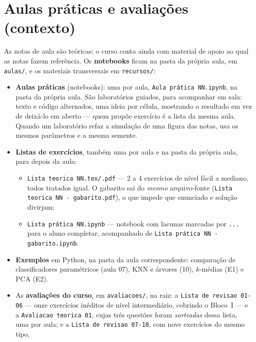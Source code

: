\documentclass[11pt,a4paper]{article}
\begin{document}
\section{Aulas práticas e avaliações (contexto)}
As notas de aula são teóricas; o curso conta ainda com material de apoio ao qual
as notas fazem referência. Os \textbf{notebooks} ficam na pasta da própria aula,
em \texttt{aulas/}, e os materiais transversais em \texttt{recursos/}:
\begin{itemize}[leftmargin=1.4cm]
  \item \textbf{Aulas práticas} (notebooks): uma por aula,
        \texttt{Aula prática NN.ipynb}, na pasta da própria aula. São
        laboratórios guiados, para acompanhar em sala: texto e código
        alternados, uma ideia por célula, mostrando o resultado em vez de
        deixá-lo em aberto --- quem propõe exercício é a lista da mesma aula.
        Quando um laboratório refaz a simulação de uma figura das notas, usa os
        mesmos parâmetros e a mesma semente.
  \item \textbf{Listas de exercícios}, também uma por aula e na pasta da própria
        aula, para depois da aula:
        \begin{itemize}
          \item \texttt{Lista teorica NN.tex/.pdf} --- 2 a 4 exercícios de
                nível fácil a mediano, todos tratados igual.
                O gabarito sai do \emph{mesmo} arquivo-fonte
                (\texttt{Lista teorica NN - gabarito.pdf}), o que impede que
                enunciado e solução divirjam;
          \item \texttt{Lista prática NN.ipynb} --- notebook com lacunas
                marcadas por \texttt{...} para o aluno completar, acompanhado de
                \texttt{Lista prática NN - gabarito.ipynb}.
        \end{itemize}
  \item \textbf{Exemplos} em Python, na pasta da aula correspondente: comparação
        de classificadores paramétricos (aula 07), KNN e árvores (10), $k$-médias
        (E1) e PCA (E2).
  \item As \textbf{avaliações do curso}, em \texttt{avaliacoes/}, na raiz: a
        \texttt{Lista de revisao 01-06} --- onze exercícios inéditos de nível
        intermediário, cobrindo o Bloco~I --- e a \texttt{Avaliacao teorica 01},
        cujas três questões foram \emph{sorteadas} dessa lista, uma por aula;
        e a \texttt{Lista de revisao 07-10}, com nove exercícios do mesmo tipo,

\end{itemize}
\end{document}
